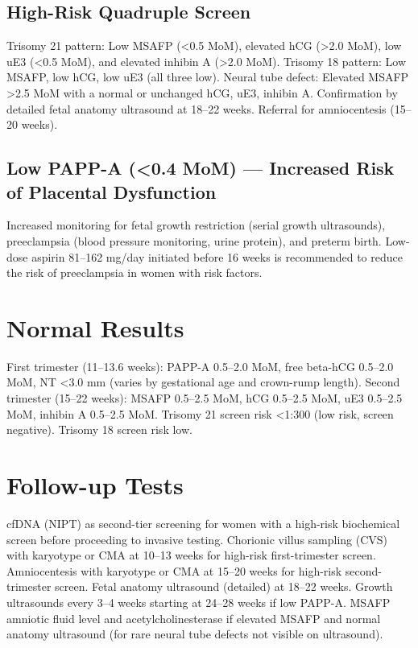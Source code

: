\subsection*{High-Risk Quadruple Screen}
Trisomy 21 pattern: Low MSAFP (<0.5 MoM), elevated hCG (>2.0 MoM), low uE3 (<0.5 MoM), and elevated inhibin A (>2.0 MoM). Trisomy 18 pattern: Low MSAFP, low hCG, low uE3 (all three low). Neural tube defect: Elevated MSAFP >2.5 MoM with a normal or unchanged hCG, uE3, inhibin A. Confirmation by detailed fetal anatomy ultrasound at 18--22 weeks. Referral for amniocentesis (15--20 weeks).

\subsection*{Low PAPP-A (<0.4 MoM) --- Increased Risk of Placental Dysfunction}
Increased monitoring for fetal growth restriction (serial growth ultrasounds), preeclampsia (blood pressure monitoring, urine protein), and preterm birth. Low-dose aspirin 81--162 mg/day initiated before 16 weeks is recommended to reduce the risk of preeclampsia in women with risk factors.

\section*{Normal Results}
First trimester (11--13.6 weeks): PAPP-A 0.5--2.0 MoM, free beta-hCG 0.5--2.0 MoM, NT <3.0 mm (varies by gestational age and crown-rump length). Second trimester (15--22 weeks): MSAFP 0.5--2.5 MoM, hCG 0.5--2.5 MoM, uE3 0.5--2.5 MoM, inhibin A 0.5--2.5 MoM. Trisomy 21 screen risk <1:300 (low risk, screen negative). Trisomy 18 screen risk low.

\section*{Follow-up Tests}
cfDNA (NIPT) as second-tier screening for women with a high-risk biochemical screen before proceeding to invasive testing. Chorionic villus sampling (CVS) with karyotype or CMA at 10--13 weeks for high-risk first-trimester screen. Amniocentesis with karyotype or CMA at 15--20 weeks for high-risk second-trimester screen. Fetal anatomy ultrasound (detailed) at 18--22 weeks. Growth ultrasounds every 3--4 weeks starting at 24--28 weeks if low PAPP-A. MSAFP amniotic fluid level and acetylcholinesterase if elevated MSAFP and normal anatomy ultrasound (for rare neural tube defects not visible on ultrasound).

